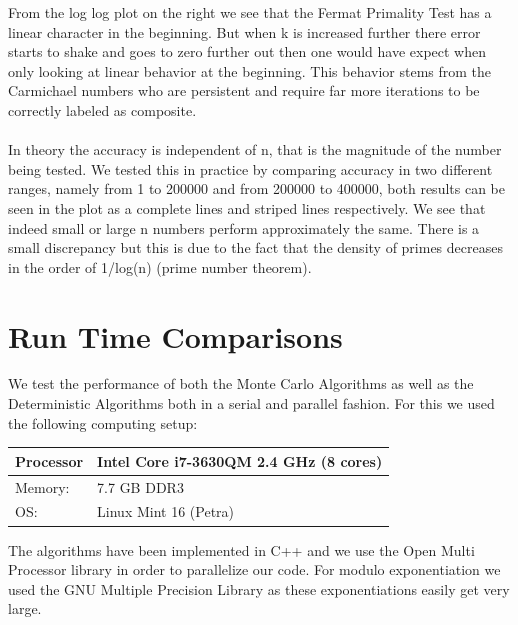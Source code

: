 \documentclass[compressed,final,notitlepage,narroweqnarray,inline,twoside,]{ieee}
\begin{document}
From the log log plot on the right we see that the Fermat Primality Test has a linear character in the beginning. But when k is increased further there error starts to shake and goes to zero further out then one would have expect when only looking at linear behavior at the beginning. This behavior stems from the Carmichael numbers who are persistent and require far more iterations to be correctly labeled as composite.\\\\ In theory the accuracy is independent of n, that is the magnitude of the number being tested. We tested this in practice by comparing accuracy in two different ranges, namely from 1 to 200000 and from 200000 to 400000, both results can be seen in the plot as a complete lines and striped lines respectively. We see that indeed small or large n numbers perform approximately the same. There is a small discrepancy but this is due to the fact that the density of primes decreases in the order of 1/log(n) (prime number theorem). 
\section{Run Time Comparisons}
We test the performance of both the Monte Carlo Algorithms as well as the Deterministic Algorithms both in a serial and parallel fashion. For this we used the following computing setup:
\begin{tabular}{l|l}
\hline
Processor & Intel Core i7-3630QM 2.4 GHz (8 cores)\\\hline
Memory: & 7.7 GB DDR3 \\\hline
OS: & Linux Mint 16 (Petra)\\\hline
\end{tabular}
The algorithms have been implemented in C++ and we use the Open Multi Processor library\cite{OMP} in order to parallelize our code. For modulo exponentiation we used the GNU Multiple Precision Library\cite{GMP} as these exponentiations easily get very large.
\end{document}
